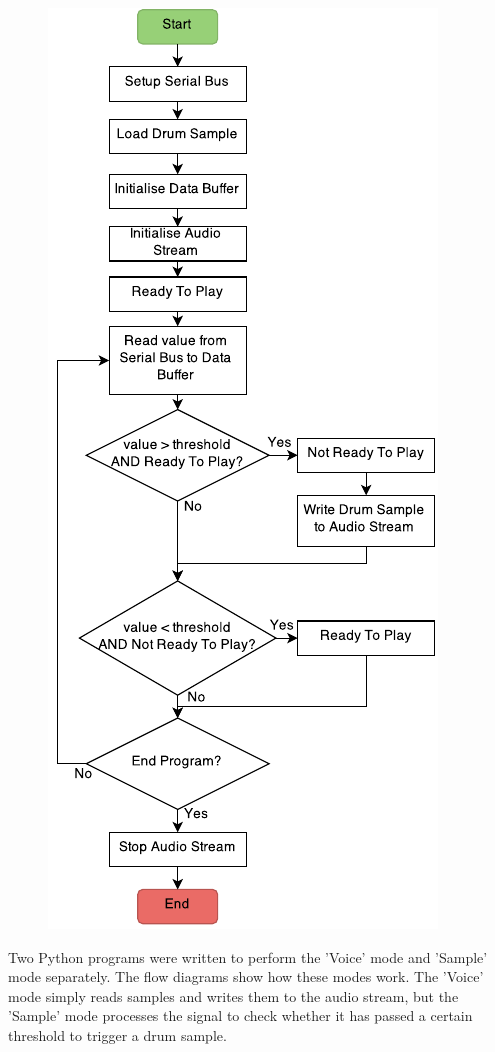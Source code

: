 \begin{figure}[H]
{\includegraphics[scale = 1]{Images/interfacesampleflow}
}
\end{figure}
Two Python programs were written to perform the 'Voice' mode and 'Sample' mode separately. The flow diagrams show how these modes work. The 'Voice' mode simply reads samples and writes them to the audio stream, but the 'Sample' mode processes the signal to check whether it has passed a certain threshold to trigger a drum sample. 

